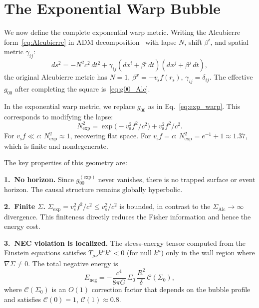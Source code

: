 \documentclass[prd,twocolumn,superscriptaddress,longbibliography]{revtex4-2}
\newcommand{\vs}{v_{\mathrm{s}}}
\newcommand{\rs}{r_{\mathrm{s}}}
\newcommand{\Fneg}{E_{\mathrm{neg}}}
\begin{document}
\section{The Exponential Warp Bubble}
\label{sec:exp_warp}

We now define the complete exponential warp metric.  Writing the
Alcubierre form~\eqref{eq:Alcubierre} in ADM
decomposition~\cite{Arnowitt1962} with lapse $N$, shift
$\beta^i$, and spatial metric $\gamma_{ij}$:
\begin{equation}
ds^2 = -N^2 c^2\,dt^2 + \gamma_{ij}(dx^i + \beta^i\,dt)(dx^j + \beta^j\,dt),
\end{equation}
the original Alcubierre metric has $N = 1$, $\beta^x = -\vs f(\rs)$,
$\gamma_{ij} = \delta_{ij}$.  The effective $g_{00}$ after
completing the square is~\eqref{eq:g00_Alc}.

In the exponential warp metric, we replace $g_{00}$ as in
Eq.~\eqref{eq:exp_warp}.  This corresponds to modifying the lapse:
\begin{equation}
N_{\mathrm{exp}}^2 = \exp\!\bigl(-\vs^2 f^2/c^2\bigr)
+ \vs^2 f^2/c^2.
\label{eq:N_exp}
\end{equation}
For $\vs f \ll c$: $N_{\mathrm{exp}}^2 \approx 1$, recovering flat
space.  For $\vs f = c$: $N_{\mathrm{exp}}^2 = e^{-1} + 1 \approx 1.37$,
which is finite and nondegenerate.

The key properties of this geometry are:

\medskip
\noindent\textbf{1.\ No horizon.}  Since $g_{00}^{(\mathrm{exp})}$
never vanishes, there is no trapped surface or event horizon.
The causal structure remains globally hyperbolic.

\medskip
\noindent\textbf{2.\ Finite $\Sigma$.}
$\Sigma_{\mathrm{exp}} = \vs^2 f^2/c^2 \leq \vs^2/c^2$ is bounded,
in contrast to the $\Sigma_{\mathrm{Alc}} \to \infty$ divergence.
This finiteness directly reduces the Fisher information and hence
the energy cost.

\medskip
\noindent\textbf{3.\ NEC violation is localized.}  The stress-energy
tensor computed from the Einstein equations satisfies
$T_{\mu\nu}k^\mu k^\nu < 0$ (for null $k^\mu$) only in the wall
region where $\nabla\Sigma \neq 0$.  The total negative energy is
\begin{equation}
\Fneg = -\frac{c^4}{8\pi G}\,\Sigma_0\,\frac{R^2}{\delta}\,
\mathcal{C}(\Sigma_0),
\label{eq:Eneg}
\end{equation}
where $\mathcal{C}(\Sigma_0)$ is an $O(1)$ correction factor that
depends on the bubble profile and satisfies
$\mathcal{C}(0) = 1$, $\mathcal{C}(1) \approx 0.8$.
\end{document}
